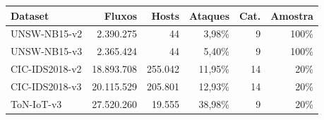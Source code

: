 \begin{tabular}{lrrrrr}
\toprule
Dataset & Fluxos & Hosts & Ataques & Cat. & Amostra \\
\midrule
UNSW-NB15-v2 & 2.390.275 & 44 & 3,98\% & 9 & 100\% \\
UNSW-NB15-v3 & 2.365.424 & 44 & 5,40\% & 9 & 100\% \\
CIC-IDS2018-v2 & 18.893.708 & 255.042 & 11,95\% & 14 & 20\% \\
CIC-IDS2018-v3 & 20.115.529 & 205.801 & 12,93\% & 14 & 20\% \\
\midrule
ToN-IoT-v3 & 27.520.260 & 19.555 & 38,98\% & 9 & 20\% \\
\bottomrule
\end{tabular}
